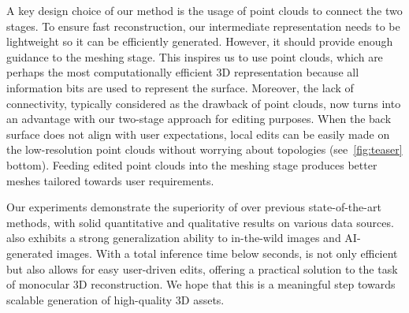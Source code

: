 A key design choice of our method is the usage of point clouds to connect the two stages. To ensure fast reconstruction, our intermediate representation needs to be lightweight so it can be efficiently generated. However, it should provide enough guidance to the meshing stage. This inspires us to use point clouds, which are perhaps the most computationally efficient 3D representation because all information bits are used to represent the surface. Moreover, the lack of connectivity, typically considered as the drawback of point clouds, now turns into an advantage with our two-stage approach for editing purposes. When the back surface does not align with user expectations, local edits can be easily made on the low-resolution point clouds without worrying about topologies (see~\cref{fig:teaser} bottom). Feeding edited point clouds into the meshing stage produces better meshes tailored towards user requirements.

Our experiments demonstrate the superiority of \method over previous state-of-the-art methods, with solid quantitative and qualitative results on various data sources.
\method also exhibits a strong generalization ability to in-the-wild images and AI-generated images. With a total inference time below \gentime seconds, \method is not only efficient but also allows for easy user-driven edits, offering a practical solution to the task of monocular 3D reconstruction. We hope that this is a meaningful step towards scalable generation of high-quality 3D assets.
